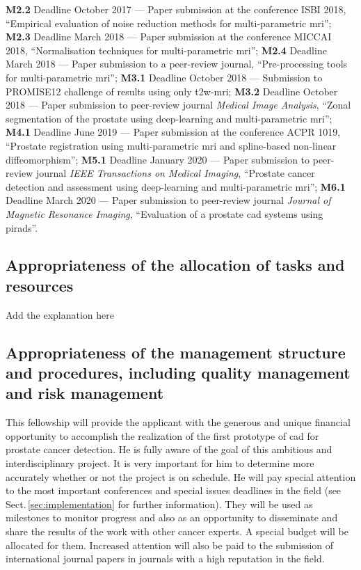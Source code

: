 \textbf{M2.2} Deadline October 2017 --- Paper submission at the conference ISBI 2018, ``Empirical evaluation of noise reduction methods for multi-parametric \ac{mri}'';
\textbf{M2.3} Deadline March 2018 --- Paper submission at the conference MICCAI 2018, ``Normalisation techniques for multi-parametric \ac{mri}'';
\textbf{M2.4} Deadline March 2018 --- Paper submission to a peer-review journal, ``Pre-processing tools for multi-parametric \ac{mri}'';
\textbf{M3.1} Deadline October 2018 --- Submission to PROMISE12 challenge of results using only \ac{t2w}-\ac{mri};
\textbf{M3.2} Deadline October 2018 --- Paper submission to peer-review journal \emph{Medical Image Analysis}, ``Zonal segmentation of the prostate using deep-learning and multi-parametric \ac{mri}'';
\textbf{M4.1} Deadline June 2019 --- Paper submission at the conference ACPR 1019, ``Prostate registration using multi-parametric \ac{mri} and spline-based non-linear diffeomorphism'';
\textbf{M5.1} Deadline January 2020 --- Paper submission to peer-review journal \emph{IEEE Transactions on Medical Imaging}, ``Prostate cancer detection and assessment using deep-learning and multi-parametric \ac{mri}'';
\textbf{M6.1} Deadline March 2020 --- Paper submission to peer-review journal \emph{Journal of Magnetic Resonance Imaging}, ``Evaluation of a prostate \ac{cad} systems using \ac{pirads}''.

\subsection{Appropriateness of the allocation of tasks and resources}

{\color{red} Add the explanation here}

\subsection{Appropriateness of the management structure and procedures, including quality management and risk management}

This fellowship will provide the applicant with the generous and unique financial opportunity to accomplish the realization of the first prototype of \ac{cad} for prostate cancer detection.
He is fully aware of the goal of this ambitious and interdisciplinary project.
It is very important for him to determine more accurately whether or not the project is on schedule. 
He will pay special attention to the most important conferences and special issues deadlines in the field (see Sect.\,\ref{sec:implementation} for further information). 
They will be used as milestones to monitor progress and also as an opportunity to disseminate and share the results of the work with other cancer experts.
A special budget will be allocated for them. 
Increased  attention will also be paid to the submission of international journal papers in journals with a high reputation in the field.

